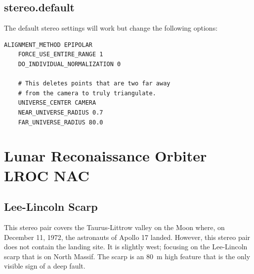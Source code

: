 \subsection*{stereo.default}

The default stereo settings will work but change the following options:

\begin{center}\begin{minipage}{5.5in}
\begin{Verbatim}[frame=single,fontsize=\small,label=additional settings for MER]
    ALIGNMENT_METHOD EPIPOLAR
    FORCE_USE_ENTIRE_RANGE 1
    DO_INDIVIDUAL_NORMALIZATION 0

    # This deletes points that are two far away
    # from the camera to truly triangulate.
    UNIVERSE_CENTER CAMERA
    NEAR_UNIVERSE_RADIUS 0.7
    FAR_UNIVERSE_RADIUS 80.0
\end{Verbatim}
\end{minipage}\end{center}

\clearpage
\section{Lunar Reconaissance Orbiter LROC NAC}

\subsection{Lee-Lincoln Scarp}

This stereo pair covers the Taurus-Littrow valley on the Moon where,
on December 11, 1972, the astronauts of Apollo 17 landed. However,
this stereo pair does not contain the landing site.  It is slightly
west; focusing on the Lee-Lincoln scarp that is on North Massif. The
scarp is an 80~m high feature that is the only visible sign of a deep
fault.

